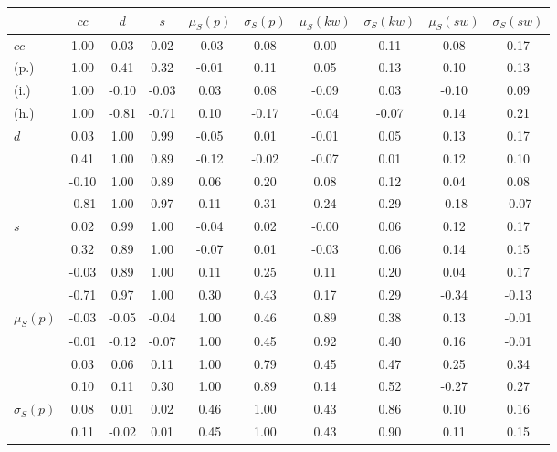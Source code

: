 \begin{table*}[h!]
\begin{center}
\begin{tabular}{| l | c | c | c | c | c | c | c | c | c |}\hline
 & $cc$ & $d$ & $s$ & $\mu_S(p)$ & $\sigma_S(p)$ & $\mu_S(kw)$ & $\sigma_S(kw)$ & $\mu_S(sw)$ & $\sigma_S(sw)$ \\\hline
$cc$ & 1.00  & 0.03  & 0.02  & -0.03  & 0.08  & 0.00  & 0.11  & 0.08  & 0.17 \\\hline
(p.) & 1.00  & 0.41  & 0.32  & -0.01  & 0.11  & 0.05  & 0.13  & 0.10  & 0.13 \\\hline
(i.) & 1.00  & -0.10  & -0.03  & 0.03  & 0.08  & -0.09  & 0.03  & -0.10  & 0.09 \\\hline
(h.) & 1.00  & -0.81  & -0.71  & 0.10  & -0.17  & -0.04  & -0.07  & 0.14  & 0.21 \\\hline
$d$ & 0.03  & 1.00  & 0.99  & -0.05  & 0.01  & -0.01  & 0.05  & 0.13  & 0.17 \\\hline
 & 0.41  & 1.00  & 0.89  & -0.12  & -0.02  & -0.07  & 0.01  & 0.12  & 0.10 \\\hline
 & -0.10  & 1.00  & 0.89  & 0.06  & 0.20  & 0.08  & 0.12  & 0.04  & 0.08 \\\hline
 & -0.81  & 1.00  & 0.97  & 0.11  & 0.31  & 0.24  & 0.29  & -0.18  & -0.07 \\\hline
$s$ & 0.02  & 0.99  & 1.00  & -0.04  & 0.02  & -0.00  & 0.06  & 0.12  & 0.17 \\\hline
 & 0.32  & 0.89  & 1.00  & -0.07  & 0.01  & -0.03  & 0.06  & 0.14  & 0.15 \\\hline
 & -0.03  & 0.89  & 1.00  & 0.11  & 0.25  & 0.11  & 0.20  & 0.04  & 0.17 \\\hline
 & -0.71  & 0.97  & 1.00  & 0.30  & 0.43  & 0.17  & 0.29  & -0.34  & -0.13 \\\hline
$\mu_S(p)$ & -0.03  & -0.05  & -0.04  & 1.00  & 0.46  & 0.89  & 0.38  & 0.13  & -0.01 \\\hline
 & -0.01  & -0.12  & -0.07  & 1.00  & 0.45  & 0.92  & 0.40  & 0.16  & -0.01 \\\hline
 & 0.03  & 0.06  & 0.11  & 1.00  & 0.79  & 0.45  & 0.47  & 0.25  & 0.34 \\\hline
 & 0.10  & 0.11  & 0.30  & 1.00  & 0.89  & 0.14  & 0.52  & -0.27  & 0.27 \\\hline
$\sigma_S(p)$ & 0.08  & 0.01  & 0.02  & 0.46  & 1.00  & 0.43  & 0.86  & 0.10  & 0.16 \\\hline
 & 0.11  & -0.02  & 0.01  & 0.45  & 1.00  & 0.43  & 0.90  & 0.11  & 0.15 \\\hline

\end{tabular}
\end{center}
\end{table*}

